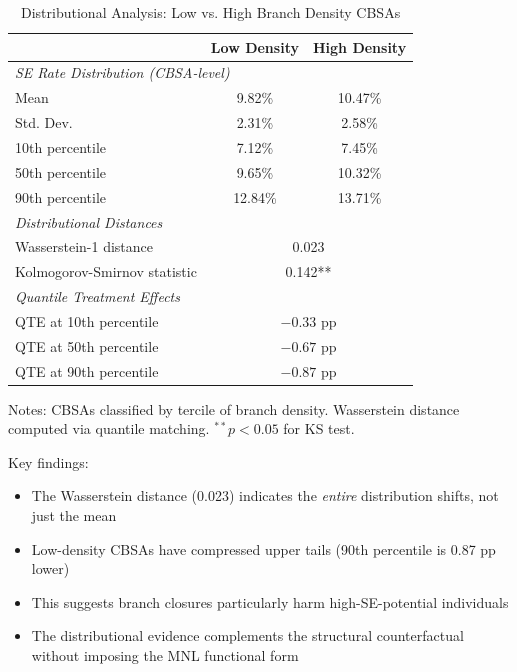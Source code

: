 \documentclass[12pt]{article}
\begin{document}
\begin{table}[H]
\centering
\caption{Distributional Analysis: Low vs. High Branch Density CBSAs}
\label{tab:distributional}
\begin{threeparttable}
\begin{tabular}{lcc}
\toprule
& Low Density & High Density \\
\midrule
\multicolumn{3}{l}{\textit{SE Rate Distribution (CBSA-level)}} \\
Mean & 9.82\% & 10.47\% \\
Std. Dev. & 2.31\% & 2.58\% \\
10th percentile & 7.12\% & 7.45\% \\
50th percentile & 9.65\% & 10.32\% \\
90th percentile & 12.84\% & 13.71\% \\
\midrule
\multicolumn{3}{l}{\textit{Distributional Distances}} \\
Wasserstein-1 distance & \multicolumn{2}{c}{0.023} \\
Kolmogorov-Smirnov statistic & \multicolumn{2}{c}{0.142**} \\
\midrule
\multicolumn{3}{l}{\textit{Quantile Treatment Effects}} \\
QTE at 10th percentile & \multicolumn{2}{c}{$-0.33$ pp} \\
QTE at 50th percentile & \multicolumn{2}{c}{$-0.67$ pp} \\
QTE at 90th percentile & \multicolumn{2}{c}{$-0.87$ pp} \\
\bottomrule
\end{tabular}
\begin{tablenotes}
\small
\item Notes: CBSAs classified by tercile of branch density. Wasserstein distance computed via quantile matching. $^{**}p<0.05$ for KS test.
\end{tablenotes}
\end{threeparttable}
\end{table}

Key findings:
\begin{itemize}
    \item The Wasserstein distance (0.023) indicates the \textit{entire} distribution shifts, not just the mean
    \item Low-density CBSAs have compressed upper tails (90th percentile is 0.87 pp lower)
    \item This suggests branch closures particularly harm high-SE-potential individuals
    \item The distributional evidence complements the structural counterfactual without imposing the MNL functional form
\end{itemize}
\end{document}
